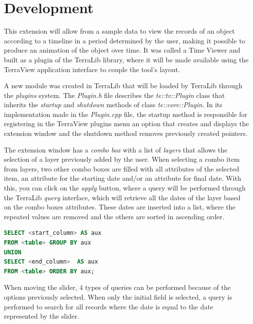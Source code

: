 \documentclass[12pt]{article}
\begin{document}
\section{Development}

This extension will allow from a sample data to view the records of an object according to a timeline in a period determined by the user, making it possible to produce an animation of the object over time. It was called a Time Viewer and built as a plugin of the TerraLib library, where it will be made available using the TerraView application interface to couple the tool's layout.

A new module was created in TerraLib that will be loaded by TerraLib through the \textit{plugins} system. The \textit{Plugin.h} file describes the \textit{te::tv::Plugin} class that inherits the \textit{startup} and \textit{shutdown} methods of class \textit{te::core::Plugin}. In its implementation made in the \textit{Plugin.cpp} file, the startup method is responsible for registering in the TerraView plugins menu an option that creates and displays the extension window and the shutdown method removes previously created pointers.

The extension window has a \textit{combo box} with a list of \textit{layers} that allows the selection of a layer previously added by the user. When selecting a combo item from layers, two other combo boxes are filled with all attributes of the selected item, an attribute for the starting date and/or an attribute for final date. With this, you can click on the \textit{apply} button, where a query will be performed through the TerraLib \textit{query} interface, which will retrieve all the dates of the layer based on the combo boxes attributes. These dates are inserted into a list, where the repeated values are removed and the others are sorted in ascending order.

\begin{center}

\begin{lstlisting}[language=SQL, caption=Query to fill the list of dates for the slider, captionpos=b, basicstyle=\footnotesize, frame=tb,
  xleftmargin=.2\textwidth, xrightmargin=.2\textwidth]
SELECT <start_column> AS aux
FROM <table> GROUP BY aux
UNION
SELECT <end_column>  AS aux
FROM <table> ORDER BY aux;
\end{lstlisting}

\end{center}

When moving the slider, 4 types of queries can be performed because of the options previously selected. When only the initial field is selected, a query is performed to search for all records where the date is equal to the date represented by the slider.
\end{document}
